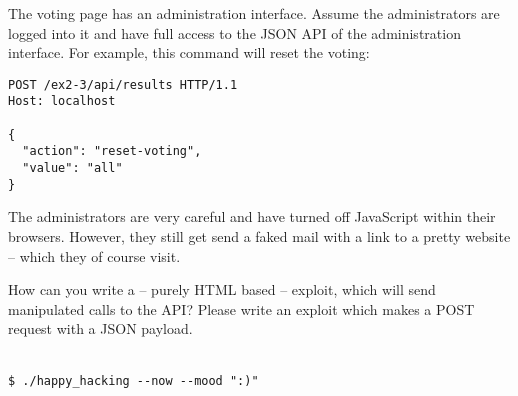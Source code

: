 \documentclass{./handout}
\begin{document}
\begin{subtask}
The voting page has an administration interface. Assume the administrators
are logged into it and have full access to the JSON API of the
administration interface.
For example, this command will reset the voting:

\begin{lstlisting}
POST /ex2-3/api/results HTTP/1.1
Host: localhost

{
  "action": "reset-voting",
  "value": "all"
}
\end{lstlisting}

The administrators are very careful and have turned off JavaScript within
their browsers.
However, they still get send a faked mail with a link to a pretty website 
-- which they of course visit.

How can you write a -- purely HTML based -- exploit, which will send 
manipulated calls to the API?
Please write an exploit which makes a POST request with a JSON payload.
\end{subtask}


\begin{comment}
\begin{subtask}
The site from the previous task has been changed, it is now a multi-step
survey -- which is still exploitable.
Develop an exploit which subsequently fills each step of the survey with 
data and eventually submits the completed survey.
\end{subtask}
\end{comment}


\center
\ \\
\texttt{\$ ./happy\_hacking -\--now -\--mood ":)"  }
\end{document}
